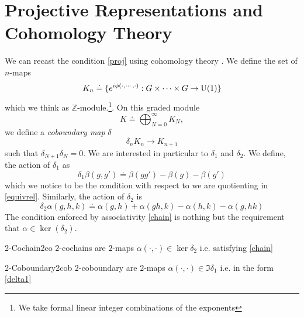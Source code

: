 \section{Projective Representations and Cohomology Theory}
We can recast the condition \eqref{proj} using cohomology theory \cite{Tachikawa:2017gyf}. We define the set of $n$-maps
\begin{equation}
    K_n \doteq \{e^{i\phi(\cdot, \cdots, \cdot)}:  G \times \cdots \times G \to \mathrm{U}(1)\}
\end{equation} 
which we think as $\mathbb{Z}$-module.\footnote{We take formal linear integer combinations of the exponents}. On this graded module 
\begin{equation}
	K \doteq \bigoplus_{N=0}^{\infty} K_N,
\end{equation}
we define a \textit{coboundary map} $\delta$
\begin{equation}
    \delta_n  K_n \to K_{n+1}
\end{equation}
such that $\delta_{N+1}  \delta_N = 0$. We are interested in particular to $\delta_1$ and $\delta_2$. We define, the action of $\delta_1$ as
\begin{equation}\label{delta1}
    \delta_1 \beta(g,g') \doteq \beta(gg') -\beta(g) -\beta(g')
\end{equation}
which we notice to be the condition with respect to we are quotienting in \eqref{equivrel}. Similarly, the action of $\delta_2$ is
\begin{equation}
    \delta_2 \alpha(g,h,k) \doteq \alpha(g,h) + \alpha(gh,k) - \alpha(h,k) -\alpha(g,hk)
\end{equation}
The condition enforced by associativity \eqref{chain} is nothing but the requirement that $\alpha \in \ker(\delta_2)$. 

\begin{defn}{2-Cochain}{2co}
	$2$-cochains are $2$-maps $\alpha(\cdot, \cdot) \in \ker \delta_2$ i.e. satisfying \eqref{chain} 
\end{defn}
\begin{defn}{2-Coboundary}{2cob}
	$2$-coboundary are $2$-maps $\alpha(\cdot, \cdot) \in \Im \delta_1$ i.e. in the form \eqref{delta1}\\
\end{defn}


